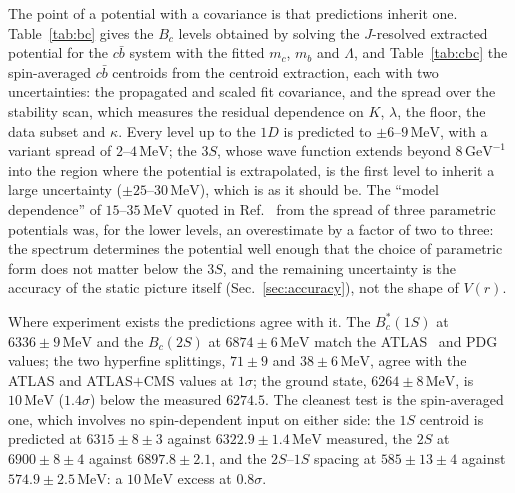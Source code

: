 \documentclass[10pt,twocolumn]{article}
\newcommand{\Bc}{B_c}
\newcommand{\Bcs}{B_c^*}
\newcommand{\cb}{c\bar b}
\newcommand{\MeV}{\,\mathrm{MeV}}
\newcommand{\GeVi}{\,\mathrm{GeV}^{-1}}
\begin{document}
The point of a potential with a covariance is that predictions inherit one.
Table~\ref{tab:bc} gives the $\Bc$ levels obtained by solving the $J$-resolved extracted potential for the $\cb$ system with the fitted $m_c$, $m_b$ and $\Lambda$, and Table~\ref{tab:cbc} the spin-averaged $\cb$ centroids from the centroid extraction, each with two uncertainties: the propagated and scaled fit covariance, and the spread over the stability scan, which measures the residual dependence on $K$, $\lambda$, the floor, the data subset and $\kappa$.
Every level up to the $1D$ is predicted to $\pm6$--$9\MeV$, with a variant spread of $2$--$4\MeV$; the $3S$, whose wave function extends beyond $8\GeVi$ into the region where the potential is extrapolated, is the first level to inherit a large uncertainty ($\pm25$--$30\MeV$), which is as it should be.
The ``model dependence'' of $15$--$35\MeV$ quoted in Ref.~\cite{Oppong2026} from the spread of three parametric potentials was, for the lower levels, an overestimate by a factor of two to three: the spectrum determines the potential well enough that the choice of parametric form does not matter below the $3S$, and the remaining uncertainty is the accuracy of the static picture itself (Sec.~\ref{sec:accuracy}), not the shape of $V(r)$.

Where experiment exists the predictions agree with it.
The $\Bcs(1S)$ at $6336\pm9\MeV$ and the $\Bc(2S)$ at $6874\pm6\MeV$ match the ATLAS~\cite{ATLAS2026} and PDG values; the two hyperfine splittings, $71\pm9$ and $38\pm6\MeV$, agree with the ATLAS and ATLAS$+$CMS values at $1\sigma$; the ground state, $6264\pm8\MeV$, is $10\MeV$ ($1.4\sigma$) below the measured $6274.5$.
The cleanest test is the spin-averaged one, which involves no spin-dependent input on either side: the $1S$ centroid is predicted at $6315\pm8\pm3$ against $6322.9\pm1.4\MeV$ measured, the $2S$ at $6900\pm8\pm4$ against $6897.8\pm2.1$, and the $2S$--$1S$ spacing at $585\pm13\pm4$ against $574.9\pm2.5\MeV$: a $10\MeV$ excess at $0.8\sigma$.
\end{document}
